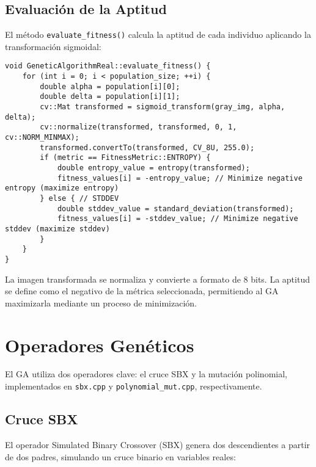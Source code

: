 \subsection{Evaluación de la Aptitud}
\label{subsec:evaluacion_aptitud}

El método \texttt{evaluate_fitness()} calcula la aptitud de cada individuo aplicando la transformación sigmoidal:

\begin{lstlisting}[style=cppstyle, caption={Evaluación de la aptitud}, label={lst:eval_fitness}]
void GeneticAlgorithmReal::evaluate_fitness() {
    for (int i = 0; i < population_size; ++i) {
        double alpha = population[i][0];
        double delta = population[i][1];
        cv::Mat transformed = sigmoid_transform(gray_img, alpha, delta);
        cv::normalize(transformed, transformed, 0, 1, cv::NORM_MINMAX);
        transformed.convertTo(transformed, CV_8U, 255.0);
        if (metric == FitnessMetric::ENTROPY) {
            double entropy_value = entropy(transformed);
            fitness_values[i] = -entropy_value; // Minimize negative entropy (maximize entropy)
        } else { // STDDEV
            double stddev_value = standard_deviation(transformed);
            fitness_values[i] = -stddev_value; // Minimize negative stddev (maximize stddev)
        }
    }
}
\end{lstlisting}

La imagen transformada se normaliza y convierte a formato de 8 bits. La aptitud se define como el negativo de la métrica seleccionada, permitiendo al GA maximizarla mediante un proceso de minimización.

\section{Operadores Genéticos}
\label{sec:operadores}

El GA utiliza dos operadores clave: el cruce SBX y la mutación polinomial, implementados en \texttt{sbx.cpp} y \texttt{polynomial\_mut.cpp}, respectivamente.

\subsection{Cruce SBX}
\label{subsec:cruce_sbx}

El operador Simulated Binary Crossover (SBX) genera dos descendientes a partir de dos padres, simulando un cruce binario en variables reales:


